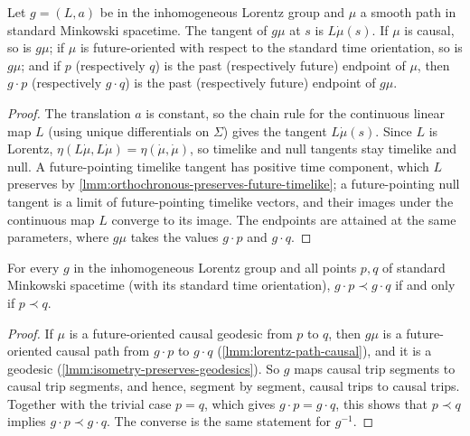 \begin{lemma}
    \label{lmm:lorentz-path-causal}
    \leanok
    Let $g = (L, a)$ be in the inhomogeneous Lorentz group and $\mu$ a smooth path in standard Minkowski spacetime. The tangent of $g\mu$ at $s$ is $L\dot\mu(s)$. If $\mu$ is causal, so is $g\mu$; if $\mu$ is future-oriented with respect to the standard time orientation, so is $g\mu$; and if $p$ (respectively $q$) is the past (respectively future) endpoint of $\mu$, then $g \cdot p$ (respectively $g \cdot q$) is the past (respectively future) endpoint of $g\mu$.
\end{lemma}
\begin{proof}
    \leanok
    The translation $a$ is constant, so the chain rule for the continuous linear map $L$ (using unique differentials on $\Sigma$) gives the tangent $L\dot\mu(s)$. Since $L$ is Lorentz, $\eta(L\dot\mu, L\dot\mu) = \eta(\dot\mu,\dot\mu)$, so timelike and null tangents stay timelike and null. A future-pointing timelike tangent has positive time component, which $L$ preserves by \ref{lmm:orthochronous-preserves-future-timelike}; a future-pointing null tangent is a limit of future-pointing timelike vectors, and their images under the continuous map $L$ converge to its image. The endpoints are attained at the same parameters, where $g\mu$ takes the values $g \cdot p$ and $g \cdot q$.
\end{proof}

\begin{theorem}
    \label{thrm:causal-precedence-lorentz-invariant}
    \leanok
    For every $g$ in the inhomogeneous Lorentz group and all points $p, q$ of standard Minkowski spacetime (with its standard time orientation), $g \cdot p \prec g \cdot q$ if and only if $p \prec q$.
\end{theorem}
\begin{proof}
    \leanok
    If $\mu$ is a future-oriented causal geodesic from $p$ to $q$, then $g\mu$ is a future-oriented causal path from $g \cdot p$ to $g \cdot q$ (\ref{lmm:lorentz-path-causal}), and it is a geodesic (\ref{lmm:isometry-preserves-geodesics}). So $g$ maps causal trip segments to causal trip segments, and hence, segment by segment, causal trips to causal trips. Together with the trivial case $p = q$, which gives $g \cdot p = g \cdot q$, this shows that $p \prec q$ implies $g \cdot p \prec g \cdot q$. The converse is the same statement for $g^{-1}$.
\end{proof}


